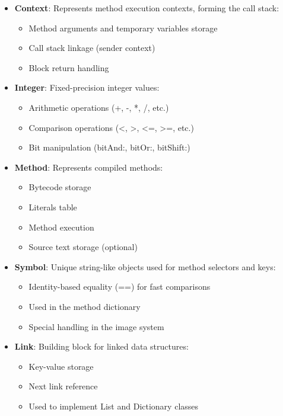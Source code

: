 \documentclass[12pt,a4paper]{report}
\begin{document}
\begin{itemize}
    \item \textbf{Context}: Represents method execution contexts, forming the call stack:
    \begin{itemize}
        \item Method arguments and temporary variables storage
        \item Call stack linkage (sender context)
        \item Block return handling
    \end{itemize}

    \item \textbf{Integer}: Fixed-precision integer values:
    \begin{itemize}
        \item Arithmetic operations (+, -, *, /, etc.)
        \item Comparison operations (<, >, <=, >=, etc.)
        \item Bit manipulation (bitAnd:, bitOr:, bitShift:)
    \end{itemize}

    \item \textbf{Method}: Represents compiled methods:
    \begin{itemize}
        \item Bytecode storage
        \item Literals table
        \item Method execution
        \item Source text storage (optional)
    \end{itemize}

    \item \textbf{Symbol}: Unique string-like objects used for method selectors and keys:
    \begin{itemize}
        \item Identity-based equality (==) for fast comparisons
        \item Used in the method dictionary
        \item Special handling in the image system
    \end{itemize}

    \item \textbf{Link}: Building block for linked data structures:
    \begin{itemize}
        \item Key-value storage
        \item Next link reference
        \item Used to implement List and Dictionary classes
    \end{itemize}
\end{itemize}
\end{document}

